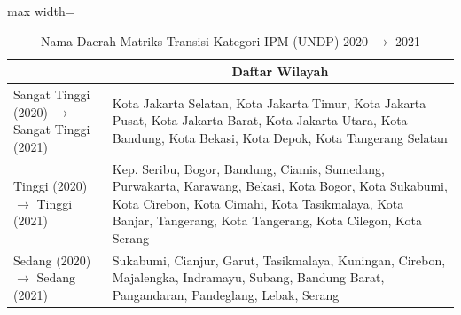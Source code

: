 \begin{table}[H]
\centering
\caption{Nama Daerah Matriks Transisi Kategori IPM (UNDP) 2020 \(\rightarrow\) 2021} \label{tab:app1ipmname2020x2021}
\begin{adjustbox}{max width=\textwidth}
\begin{tabular}{|>{\centering\arraybackslash}p{4cm}|p{10cm}|}
\hline
\multicolumn{1}{|c|}{\textbf{Kategori}} & \multicolumn{1}{c|}{\textbf{Daftar Wilayah}} \\
\hline
Sangat Tinggi (2020) \(\rightarrow\) Sangat Tinggi (2021) & Kota Jakarta Selatan, Kota Jakarta Timur, Kota Jakarta Pusat, Kota Jakarta Barat, Kota Jakarta Utara, Kota Bandung, Kota Bekasi, Kota Depok, Kota Tangerang Selatan \\
\hline
Tinggi (2020) \(\rightarrow\) Tinggi (2021) & Kep. Seribu, Bogor, Bandung, Ciamis, Sumedang, Purwakarta, Karawang, Bekasi, Kota Bogor, Kota Sukabumi, Kota Cirebon, Kota Cimahi, Kota Tasikmalaya, Kota Banjar, Tangerang, Kota Tangerang, Kota Cilegon, Kota Serang \\
\hline
Sedang (2020) \(\rightarrow\) Sedang (2021) & Sukabumi, Cianjur, Garut, Tasikmalaya, Kuningan, Cirebon, Majalengka, Indramayu, Subang, Bandung Barat, Pangandaran, Pandeglang, Lebak, Serang \\
\hline
\end{tabular}
\end{adjustbox}
\end{table}